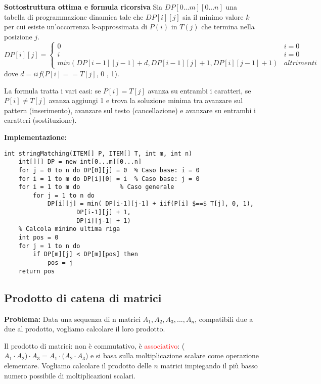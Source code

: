 \documentclass[../cheatSheetAlgoritmi.tex]{subfiles}
\begin{document}
\bigskip

\textbf{Sottostruttura ottima e formula ricorsiva}
Sia $DP[0...m][0...n]$ una tabella di programmazione dinamica tale che $DP[i][j]$ sia il minimo valore $k$ per cui esiste un’occorrenza k-approssimata di $P(i)$ in $T(j)$ che termina nella posizione $j$.
\begin{equation*}
  	DP[i][j] =\begin{cases}
    	0 & \text{$i = 0$}\\
    	i & \text{$i = 0$}\\
    	min(DP[i-1][j-1] + d , DP[i-1][j] + 1, DP[i][j-1] + 1)  & \text{$altrimenti$}   	
  	\end{cases}
\end{equation*}
dove $d = iif(P[i] == T[j]$, 0 , 1).
\newpage
\begin{flushleft}
La formula tratta i vari casi: se $P[i]=T[j]$ avanza su entrambi i caratteri, se $P[i] \neq T[j]$ avanza aggiungi 1 e trova la soluzione minima tra avanzare sul pattern (inserimento), avanzare sul testo (cancellazione) e avanzare su entrambi i caratteri (sostituzione).
\end{flushleft}
\textbf{Implementazione:}
\begin{lstlisting}[caption=String matching approssimato]
int stringMatching(ITEM[] P, ITEM[] T, int m, int n)
	int[][] DP = new int[0...m][0...n]
	for j = 0 to n do DP[0][j] = 0  % Caso base: i = 0
	for i = 1 to m do DP[i][0] = i  % Caso base: j = 0
	for i = 1 to m do        	% Caso generale 
		for j = 1 to n do
			DP[i][j] = min( DP[i-1][j-1] + iif(P[i] $==$ T[j], 0, 1),	
					DP[i-1][j] + 1,
					DP[i][j-1] + 1)
	% Calcola minimo ultima riga
	int pos = 0 
	for j = 1 to n do
		if DP[m][j] < DP[m][pos] then
			pos = j
	return pos
\end{lstlisting}

\subsection{Prodotto di catena di matrici}
\textbf{Problema:} Data una sequenza di n matrici $A_1, A_2, A_3, ..., A_n$, compatibili due a due al prodotto, vogliamo calcolare il loro prodotto.

Il prodotto di matrici: non è commutativo, è \textcolor{red}{associativo}: ($A_1 \cdot A_2) \cdot A_3 = A_1 \cdot (A_2 \cdot A_3$) e si basa sulla moltiplicazione scalare come operazione elementare. Vogliamo calcolare il prodotto delle $n$ matrici impiegando il più basso numero possibile di moltiplicazioni scalari.
\end{document}
